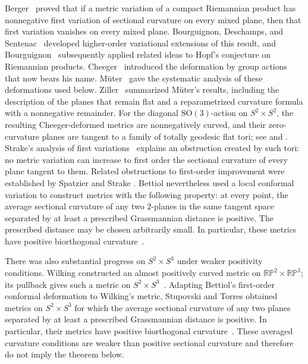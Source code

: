 \documentclass[11pt]{article}
\theoremstyle{definition}
\theoremstyle{remark}
\begin{document}
Berger~\cite{Berger1966} proved that if a metric variation of a compact Riemannian product has
nonnegative first variation of sectional curvature on every mixed plane,
then that first variation vanishes on every mixed plane.
Bourguignon, Deschamps, and Sentenac~\cite{BDS1972} developed higher-order variational
extensions of this result, and
Bourguignon~\cite{Bourguignon1975} subsequently applied related ideas to
Hopf's conjecture on Riemannian products.  Cheeger~\cite{Cheeger1973} introduced the deformation
by group actions that now bears his name.  M\"uter~\cite{Muter1987} gave the systematic analysis of these
deformations used below.  Ziller~\cite{Ziller2009} summarized M\"uter's results, including the
description of the planes that remain flat and a reparametrized curvature
formula with a nonnegative remainder.  For the
diagonal $\mathrm{SO}(3)$-action on $S^2\times S^2$, the resulting
Cheeger-deformed metrics are nonnegatively curved, and their zero-curvature
planes are tangent to a family of totally geodesic flat tori; see
\cite{Muter1987} and \cite[Proposition~2.3]{Bettiol2014}.
Strake's analysis of first variations~\cite{Strake1987} explains an obstruction
created by such tori: no metric variation can increase to first order the
sectional curvature of every plane tangent to them.  Related obstructions to
first-order improvement were established by Spatzier and Strake
\cite[Section~5]{SpatzierStrake1990}.  Bettiol nevertheless used a local
conformal variation to construct metrics with the following property: at
every point, the average sectional curvature of any two $2$-planes in the
same tangent space separated by at least a prescribed Grassmannian distance
is positive.  The prescribed distance may be chosen arbitrarily small.  In
particular, these metrics have positive
biorthogonal curvature~\cite{Bettiol2014}.

There was also substantial progress on $S^2\times S^3$ under weaker
positivity conditions.  Wilking constructed an almost positively curved
metric on $\mathbb{RP}^2\times\mathbb{RP}^3$; its pullback gives such a
metric on $S^2\times S^3$~\cite[Corollary~3 and
Proposition~6]{Wilking2002}.  Adapting Bettiol's first-order conformal
deformation to Wilking's metric, Stupovski and Torres obtained metrics on
$S^2\times S^3$ for which the average sectional curvature of any two planes
separated by at least a prescribed Grassmannian distance is positive.  In particular,
their metrics have positive biorthogonal
curvature~\cite[Theorem~A]{StupovskiTorres2020}.
These averaged curvature conditions are weaker than positive sectional
curvature and therefore do not imply the theorem below.
\end{document}
